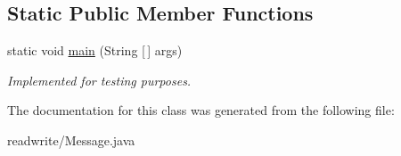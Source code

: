 \subsection*{Static Public Member Functions}
\begin{DoxyCompactItemize}
\item 
\mbox{\label{class_message_aabda3e5fd7680cf235e10a8fccae8c7a}} 
static void \hyperlink{class_message_aabda3e5fd7680cf235e10a8fccae8c7a}{main} (String \mbox{[}$\,$\mbox{]} args)
\begin{DoxyCompactList}\small\item\em Implemented for testing purposes. \end{DoxyCompactList}\end{DoxyCompactItemize}


The documentation for this class was generated from the following file\+:\begin{DoxyCompactItemize}
\item 
readwrite/Message.\+java\end{DoxyCompactItemize}
